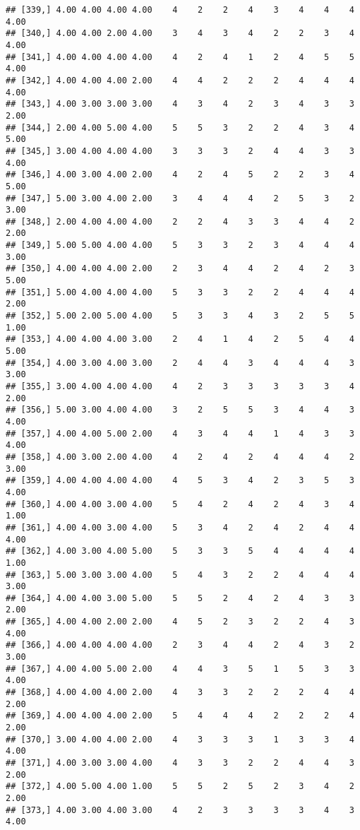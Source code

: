 \documentclass[]{article}
\begin{document}
\begin{verbatim}
## [339,] 4.00 4.00 4.00 4.00    4    2    2    4    3    4    4    4 4.00
## [340,] 4.00 4.00 2.00 4.00    3    4    3    4    2    2    3    4 4.00
## [341,] 4.00 4.00 4.00 4.00    4    2    4    1    2    4    5    5 4.00
## [342,] 4.00 4.00 4.00 2.00    4    4    2    2    2    4    4    4 4.00
## [343,] 4.00 3.00 3.00 3.00    4    3    4    2    3    4    3    3 2.00
## [344,] 2.00 4.00 5.00 4.00    5    5    3    2    2    4    3    4 5.00
## [345,] 3.00 4.00 4.00 4.00    3    3    3    2    4    4    3    3 4.00
## [346,] 4.00 3.00 4.00 2.00    4    2    4    5    2    2    3    4 5.00
## [347,] 5.00 3.00 4.00 2.00    3    4    4    4    2    5    3    2 3.00
## [348,] 2.00 4.00 4.00 4.00    2    2    4    3    3    4    4    2 2.00
## [349,] 5.00 5.00 4.00 4.00    5    3    3    2    3    4    4    4 3.00
## [350,] 4.00 4.00 4.00 2.00    2    3    4    4    2    4    2    3 5.00
## [351,] 5.00 4.00 4.00 4.00    5    3    3    2    2    4    4    4 2.00
## [352,] 5.00 2.00 5.00 4.00    5    3    3    4    3    2    5    5 1.00
## [353,] 4.00 4.00 4.00 3.00    2    4    1    4    2    5    4    4 5.00
## [354,] 4.00 3.00 4.00 3.00    2    4    4    3    4    4    4    3 3.00
## [355,] 3.00 4.00 4.00 4.00    4    2    3    3    3    3    3    4 2.00
## [356,] 5.00 3.00 4.00 4.00    3    2    5    5    3    4    4    3 4.00
## [357,] 4.00 4.00 5.00 2.00    4    3    4    4    1    4    3    3 4.00
## [358,] 4.00 3.00 2.00 4.00    4    2    4    2    4    4    4    2 3.00
## [359,] 4.00 4.00 4.00 4.00    4    5    3    4    2    3    5    3 4.00
## [360,] 4.00 4.00 3.00 4.00    5    4    2    4    2    4    3    4 1.00
## [361,] 4.00 4.00 3.00 4.00    5    3    4    2    4    2    4    4 4.00
## [362,] 4.00 3.00 4.00 5.00    5    3    3    5    4    4    4    4 1.00
## [363,] 5.00 3.00 3.00 4.00    5    4    3    2    2    4    4    4 3.00
## [364,] 4.00 4.00 3.00 5.00    5    5    2    4    2    4    3    3 2.00
## [365,] 4.00 4.00 2.00 2.00    4    5    2    3    2    2    4    3 4.00
## [366,] 4.00 4.00 4.00 4.00    2    3    4    4    2    4    3    2 3.00
## [367,] 4.00 4.00 5.00 2.00    4    4    3    5    1    5    3    3 4.00
## [368,] 4.00 4.00 4.00 2.00    4    3    3    2    2    2    4    4 2.00
## [369,] 4.00 4.00 4.00 2.00    5    4    4    4    2    2    2    4 2.00
## [370,] 3.00 4.00 4.00 2.00    4    3    3    3    1    3    3    4 4.00
## [371,] 4.00 3.00 3.00 4.00    4    3    3    2    2    4    4    3 2.00
## [372,] 4.00 5.00 4.00 1.00    5    5    2    5    2    3    4    2 2.00
## [373,] 4.00 3.00 4.00 3.00    4    2    3    3    3    3    4    3 4.00

\end{verbatim}
\end{document}
